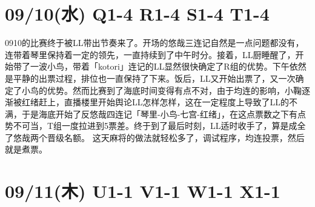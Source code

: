 \section{09/10(水) Q1-4 R1-4 S1-4 T1-4}


0910的比赛终于被LL带出节奏来了。开场的悠哉三连记自然是一点问题都没有，连带着琴里保持着一定的领先，一直持续到了中午时分。接着，LL厨睡醒了，开始带了一波小鸟，带着「kotori」连记的LL显然很快确定了R组的优势。下午依然是平静的出票过程，排位也一直保持了下来。饭后，LL又开始出票了，又一次确定了小鸟的优势。然而比赛到了海底时间变得有点不对，由于均连的影响，小鞠逐渐被红绪赶上，直播楼里开始舆论LL怎样怎样，这在一定程度上导致了LL的不满，于是海底开始了反悠哉四连记「琴里-小鸟-七宫-红绪」，在这点票数之下有点势不可当，T组一度拉进到5票差。终于到了最后时刻，LL适时收手了，算是成全了悠哉两个晋级名额。
这天麻将的做法就轻松多了，调试程序，均连投票，然后就是煮票。

\section{09/11(木) U1-1 V1-1 W1-1 X1-1}

